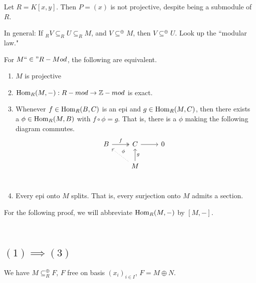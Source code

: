 \documentclass[x11names,reqno,14pt]{extarticle}
\newcommand{\fin}{``\in"}
\begin{document}
Let $R = K[x, y]$. Then $P = (x)$ is not projective, despite being a submodule of $R$. 

In general: If $_RV\subseteq_RU\subseteq_RM$, and $V\subseteq^\oplus M$, then $V\subseteq^\oplus U$. Look up the ``modular law."

\thm

For $M\fin R-Mod$, the following are equivalent. 

\begin{enumerate}

\item $M$ is projective

\item ${\mathrm{Hom}}_R(M, -):R-mod\to\mathbb{Z}-mod$ is exact.

\item Whenever $f\in{\mathrm{Hom}}_R(B, C)$ is an epi and $g\in{\mathrm{Hom}}_R(M, C)$, then there exists a $\phi\in{\mathrm{Hom}}_R(M, B)$ with $f\circ\phi=g$. That is, there is a $\phi$ making the following diagram commutes. 
\[
\begin{tikzcd}
B\ar[r, twoheadrightarrow, "f"] & C \ar[r]&0 \\
& M \ar[ul, dotted, "\phi"'] \ar[u, "g"'] \\
\end{tikzcd}
\]

\item Every epi onto $M$ splits. That is, every surjection onto $M$ admits a section.

\end{enumerate}

For the following proof, we will abbreviate ${\mathrm{Hom}}_R(M, -)$ by $[M, -]$. 

\proof\,

\subsection{$(1)\implies(3)$}

We have $M \subseteq^\oplus _RF$, $F$ free on basis $(x_i)_{i\in I}$, $F = M\oplus N$. 
\end{document}
